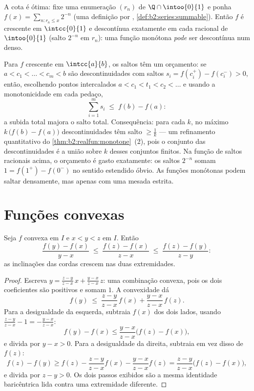 \begin{example}
A cota é ótima: fixe uma enumeração $(r_n)$ de $\Q \cap
\intoo{0}{1}$ e ponha $f(x) = \sum_{n : r_n \leq x} 2^{-n}$
(uma definição por ,
\cref{def:b2:series:summable}). Então $f$ é crescente em
$\intcc{0}{1}$ e descontínua exatamente em cada racional de
$\intoo{0}{1}$ (salto $2^{-n}$ em $r_n$): uma função monótona
\emph{pode} ser descontínua num  denso.
\end{example}

\begin{example}\label{ex:b2:realfun:jumpbudget}
Para $f$ crescente em $\intcc{a}{b}$, os saltos têm um orçamento:
se $a < c_1 < \dots < c_m < b$ são descontinuidades com saltos
$s_i = f(c_i^+) - f(c_i^-) > 0$, então, escolhendo pontos
intercalados $a < c_1 < t_1 < c_2 < \dots$ e usando a monotonicidade em
cada pedaço,
\[
\sum_{i=1}^{m} s_i \;\leq\; f(b) - f(a) :
\]
a subida total majora o salto total. Consequência: para
cada $k$, no máximo $k\,\bigl(f(b) - f(a)\bigr)$ descontinuidades
têm salto $\geq \frac1k$ --- um refinamento quantitativo do
\cref{thm:b2:realfun:monotone}~(2), pois o conjunto das descontinuidades
é a união  sobre $k$ desses conjuntos finitos. Na
função de saltos racionais acima, o orçamento é gasto exatamente:
os saltos $2^{-n}$ somam $1 = f(1^+) - f(0^-)$ no sentido estendido
óbvio. As funções monótonas podem saltar densamente, mas apenas
com uma mesada estrita.
\end{example}

\section{Funções convexas}

\begin{lemma}\label{lem:b2:realfun:slopes}
Seja $f$ convexa em $I$ e $x < y < z$ em $I$. Então
\[
\frac{f(y) - f(x)}{y - x}
\;\leq\; \frac{f(z) - f(x)}{z - x}
\;\leq\; \frac{f(z) - f(y)}{z - y} :
\]
as inclinações das cordas crescem nas duas extremidades.
\end{lemma}

\begin{proof}
Escreva $y = \frac{z - y}{z - x}\,x + \frac{y - x}{z - x}\,z$: uma
combinação convexa, pois os dois coeficientes são positivos e
somam $1$. A convexidade dá
\[
f(y) \;\leq\; \frac{z-y}{z-x}\,f(x) + \frac{y-x}{z-x}\,f(z).
\]
Para a desigualdade da esquerda, subtraia $f(x)$ dos dois lados, usando
$\frac{z-y}{z-x} - 1 = -\frac{y-x}{z-x}$:
\[
f(y) - f(x) \leq \frac{y - x}{z - x}\bigl(f(z) - f(x)\bigr),
\]
e divida por $y - x > 0$. Para a desigualdade da direita, subtraia
em vez disso de $f(z)$:
\[
f(z) - f(y) \geq f(z) - \frac{z-y}{z-x}f(x) -
\frac{y-x}{z-x}f(z)
= \frac{z - y}{z - x}\bigl(f(z) - f(x)\bigr),
\]
e divida por $z - y > 0$. Os dois passos exibidos são a mesma
identidade baricêntrica lida contra uma extremidade diferente.
\end{proof}

